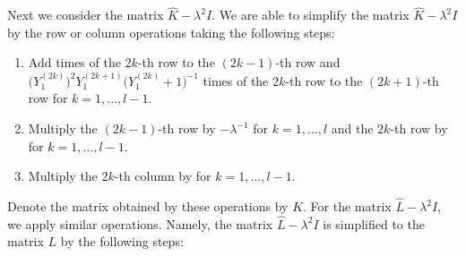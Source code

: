\documentclass[10pt,a4paper]{amsart}
\numberwithin{equation}{section}
\begin{document}
Next we consider the matrix $\hat{K}-\lambda^2I$.
We are able to simplify the matrix $\hat{K}-\lambda^2I$ by the row or column operations taking the following steps:
	\begin{enumerate}\itemsep=0pt
		\item Add  times of the $2k$-th row to the $(2k-1)$-th row and $\bigl(Y_1^{(2k)}\bigr)^2Y_1^{(2k+1)}\bigl(Y_1^{(2k)}\!+1\bigr)^{-1}$ times of the $2k$-th row to the $(2k+1)$-th row for $k=1,\dots,l-1$.
		\item Multiply the $(2k-1)$-th row by $-\lambda^{-1}$ for $k=1,\dots,l$ and the $2k$-th row by  for $k=1,\dots,l-1$.
		\item Multiply the $2k$-th column by  for $k=1,\dots,{l-1}$.
	\end{enumerate}
Denote the matrix obtained by these operations by $K$.
For the matrix $\hat{L}-\lambda^2I$, we apply similar operations.
Namely, the matrix $\hat{L}-\lambda^2I$ is simplified to the matrix $L$ by the following steps:
\end{document}
